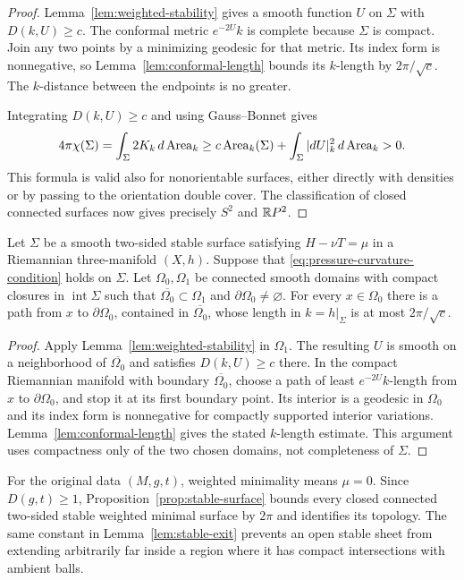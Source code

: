 \begin{proof}
Lemma~\ref{lem:weighted-stability} gives a smooth function $U$ on
$\Sigma$ with $D(k,U)\ge c$.  The conformal metric $e^{-2U}k$ is
complete because $\Sigma$ is compact.  Join any two points by a
minimizing geodesic for that metric.  Its index form is nonnegative,
so Lemma~\ref{lem:conformal-length} bounds its $k$-length by
$2\pi/\sqrt c$.  The $k$-distance between the endpoints is no greater.

Integrating $D(k,U)\ge c$ and using Gauss--Bonnet gives
\[
 4\pi\chi(\Sigma)
 =\int_\Sigma 2K_k\,d\operatorname{Area}_k
 \ge c\operatorname{Area}_k(\Sigma)+\int_\Sigma|dU|_k^2\,d\operatorname{Area}_k>0.
\]
This formula is valid also for nonorientable surfaces, either directly
with densities or by passing to the orientation double cover.  The
classification of closed connected surfaces now gives precisely
$S^2$ and $\mathbb R P^2$.
\end{proof}

\begin{lemma}\label{lem:stable-exit}
Let $\Sigma$ be a smooth two-sided stable surface satisfying
$H-\nu T=\mu$ in a Riemannian three-manifold $(X,h)$.  Suppose that
\eqref{eq:pressure-curvature-condition} holds on $\Sigma$.
Let $\Omega_0,\Omega_1$ be connected smooth domains with compact closures
in $\operatorname{int}\Sigma$ such that $\overline{\Omega_0}\subset\Omega_1$ and
$\partial\Omega_0\ne\varnothing$.  For every $x\in\Omega_0$ there
is a path from $x$ to $\partial\Omega_0$, contained in
$\overline{\Omega_0}$, whose length in $k=h|_\Sigma$ is at most
$2\pi/\sqrt c$.
\end{lemma}

\begin{proof}
Apply Lemma~\ref{lem:weighted-stability} in $\Omega_1$.  The resulting
$U$ is smooth on a neighborhood of $\overline{\Omega_0}$ and
satisfies $D(k,U)\ge c$ there.  In the compact Riemannian manifold
with boundary $\overline{\Omega_0}$, choose a path of least
$e^{-2U}k$-length from $x$ to $\partial\Omega_0$, and stop it at its
first boundary point.  Its interior is a geodesic in $\Omega_0$ and
its index form is nonnegative for compactly supported interior
variations.  Lemma~\ref{lem:conformal-length} gives the stated
$k$-length estimate.  This argument uses compactness only of the two
chosen domains, not completeness of $\Sigma$.
\end{proof}

For the original data $(M,g,t)$, weighted minimality means $\mu=0$.
Since $D(g,t)\ge1$, Proposition~\ref{prop:stable-surface} bounds every
closed connected two-sided stable weighted minimal surface by $2\pi$
and identifies its topology.  The same constant in
Lemma~\ref{lem:stable-exit} prevents an open stable sheet from extending
arbitrarily far inside a region where it has compact intersections with
ambient balls.
